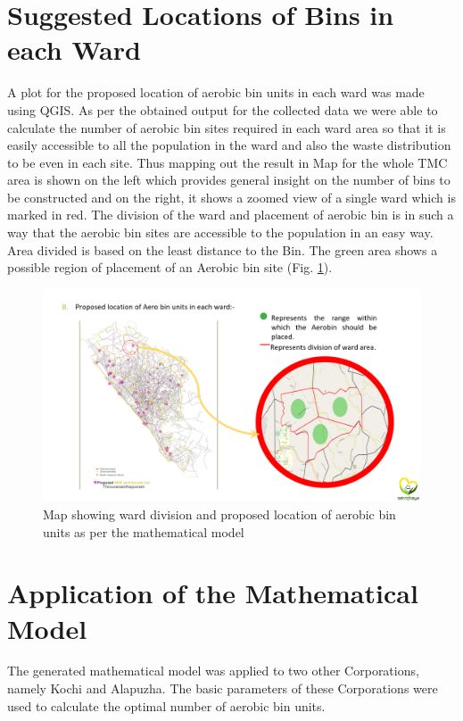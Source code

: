 \documentclass[12pt,a4paper]{report}
\begin{document}
\section{Suggested Locations of Bins in each Ward}
A plot for the proposed location of aerobic bin units in each ward was made using QGIS. As per the obtained output for the collected data we were able to calculate the number of aerobic bin sites required in each ward area so that it is easily accessible to all the population in the ward and also the waste distribution to be even in each site. Thus mapping out the result in Map for the whole TMC area is shown on the left which provides general insight on the number of bins to be constructed and on the right, it shows a zoomed view of a single ward which is marked in red. The division of the ward and placement of aerobic bin is in such a way that the aerobic bin sites are accessible to the population in an easy way. Area divided is based on the least distance to the Bin. The green area shows a possible region of placement of an Aerobic bin site (Fig. \ref{fig:binloc}).

\begin{figure}[H]
	\centering
	\includegraphics[width=1\linewidth]{bin_loc}
	\caption{Map showing ward division and proposed location of aerobic bin units as per the mathematical model}
	\label{fig:binloc}
\end{figure}

\newpage
\section{Application of the Mathematical Model}
The generated mathematical model was applied to two other Corporations, namely Kochi and Alapuzha. The basic parameters of these Corporations were used to calculate the optimal number of aerobic bin units.
\end{document}
